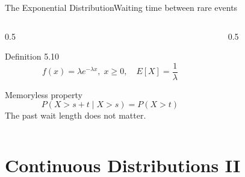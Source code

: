 \documentclass[aspectratio=169,11pt]{beamer}
\begin{document}
\begin{frame}{The Exponential Distribution}{Waiting time between rare events}
  \begin{columns}[T]
    \begin{column}{0.5\textwidth}
      \begin{block}{Definition 5.10}
        \[ f(x) = \lambda e^{-\lambda x}, \; x\ge 0, \quad E[X]=\frac1\lambda \]
      \end{block}
      \begin{alertblock}{Memoryless property}
        \small \[ P(X > s+t \mid X > s) = P(X>t) \]
        \small The past wait length does not matter.
      \end{alertblock}
    \end{column}
    \begin{column}{0.5\textwidth}
      \centering
    \end{column}
  \end{columns}
\end{frame}

\section{Continuous Distributions II}
\end{document}

